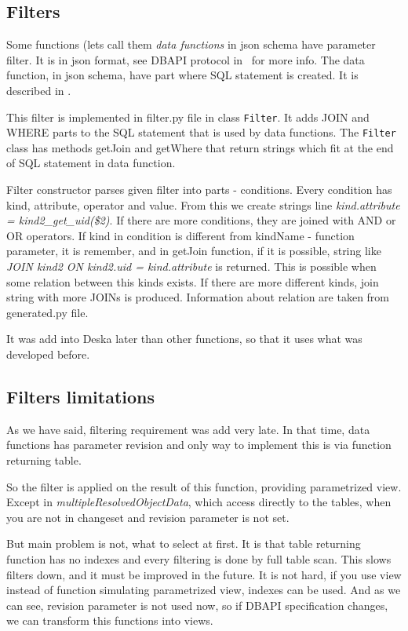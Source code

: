\documentclass[deska]{subfiles}
\begin{document}
\subsection{Filters}

Some functions (lets call them {\em data functions} in json schema have parameter filter. It is in json format,
see DBAPI protocol in~ for more info.
The data function, in json schema, have part where SQL statement is created. It is described in
.

This filter is implemented in filter.py file in class {\tt Filter}.
It adds JOIN and WHERE parts to the SQL statement that is used by data functions. The {\tt Filter} class has
methods getJoin and getWhere that return strings which fit at the end of SQL statement in data function.

Filter constructor parses given filter into parts - conditions.
Every condition has kind, attribute, operator and value. From this we create strings line
{\em kind.attribute = kind2\_get\_uid(\$2)}. If there are more conditions, they are joined with AND or OR
operators.
If kind in condition is different from kindName - function parameter, it is remember,
and in getJoin function, if it is possible, string like {\em JOIN kind2 ON kind2.uid = kind.attribute}
is returned. This is possible when some relation between this kinds exists.
If there are more different kinds, join string with more JOINs is produced.
Information about relation are taken from generated.py file.

It was add into Deska later than other functions, so that it uses what was developed before.

\subsection{Filters limitations}
\label{sec:filter-speed}
As we have said, filtering requirement was add very late. In that time, data functions has parameter revision
and only way to implement this is via function returning table.

So the filter is applied on the result of this function, providing parametrized view.
Except in {\em multipleResolvedObjectData}, which access directly to the tables, when
you are not in changeset and revision parameter is not set.

But main problem is not, what to select at first. It is that table returning function has
no indexes and every filtering is done by full table scan.
This slows filters down, and it must be improved in the future. It is not hard,
if you use view instead of function simulating parametrized view, indexes can be used.
And as we can see, revision parameter is not used now, so if DBAPI specification changes,
we can transform this functions into views. 
\end{document}
